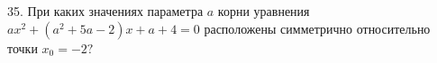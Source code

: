 35. При каких значениях параметра $a$ корни уравнения $ax^2+(a^2+5a-2)x+a+4=0$ расположены симметрично относительно точки $x_0=-2?$\\
